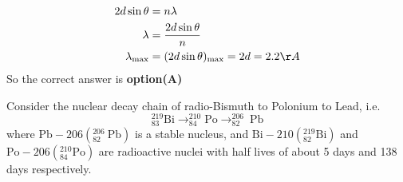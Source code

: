 \begin{questions}
\begin{answer}
	$$
	\begin{aligned}
	2 d \sin \theta &=n \lambda \\
	\lambda &=\frac{2 d \sin \theta}{n} \\
	\lambda_{\max } &=(2 d \sin \theta)_{\max }=2 d=2.2 \AA
	\end{aligned}
	$$
	So the correct answer is \textbf{option(A)}
\end{answer}
\begin{minipage}{\textwidth}
	\question Consider the nuclear decay chain of radio-Bismuth to Polonium to Lead, i.e.
	$$
	{ }_{83}^{219} \mathrm{Bi} \rightarrow_{84}^{210} \mathrm{Po} \rightarrow_{82}^{206} \mathrm{~Pb}
	$$
	where $\mathrm{Pb}-206\left({ }_{82}^{206} \mathrm{~Pb}\right)$ is a stable nucleus, and $\mathrm{Bi}-210\left({ }_{82}^{219} \mathrm{Bi}\right)$ and $\mathrm{Po}-206\left({ }_{84}^{210} \mathrm{Po}\right)$ are radioactive nuclei with half lives of about 5 days and 138 days respectively.
	

\end{minipage}
\end{questions}
